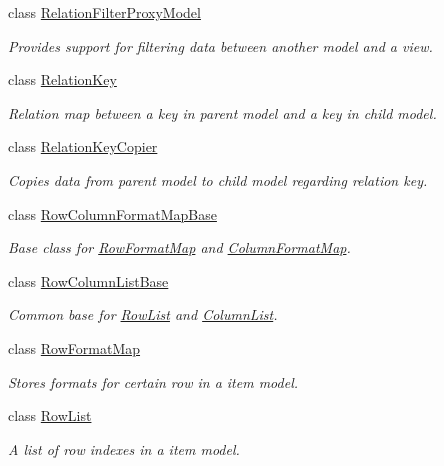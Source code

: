 \begin{DoxyCompactItemize}
class \hyperlink{class_mdt_1_1_item_model_1_1_relation_filter_proxy_model}{Relation\+Filter\+Proxy\+Model}
\begin{DoxyCompactList}\small\item\em Provides support for filtering data between another model and a view. \end{DoxyCompactList}\item 
class \hyperlink{class_mdt_1_1_item_model_1_1_relation_key}{Relation\+Key}
\begin{DoxyCompactList}\small\item\em Relation map between a key in parent model and a key in child model. \end{DoxyCompactList}\item 
class \hyperlink{class_mdt_1_1_item_model_1_1_relation_key_copier}{Relation\+Key\+Copier}
\begin{DoxyCompactList}\small\item\em Copies data from parent model to child model regarding relation key. \end{DoxyCompactList}\item 
class \hyperlink{class_mdt_1_1_item_model_1_1_row_column_format_map_base}{Row\+Column\+Format\+Map\+Base}
\begin{DoxyCompactList}\small\item\em Base class for \hyperlink{class_mdt_1_1_item_model_1_1_row_format_map}{Row\+Format\+Map} and \hyperlink{class_mdt_1_1_item_model_1_1_column_format_map}{Column\+Format\+Map}. \end{DoxyCompactList}\item 
class \hyperlink{class_mdt_1_1_item_model_1_1_row_column_list_base}{Row\+Column\+List\+Base}
\begin{DoxyCompactList}\small\item\em Common base for \hyperlink{class_mdt_1_1_item_model_1_1_row_list}{Row\+List} and \hyperlink{class_mdt_1_1_item_model_1_1_column_list}{Column\+List}. \end{DoxyCompactList}\item 
class \hyperlink{class_mdt_1_1_item_model_1_1_row_format_map}{Row\+Format\+Map}
\begin{DoxyCompactList}\small\item\em Stores formats for certain row in a item model. \end{DoxyCompactList}\item 
class \hyperlink{class_mdt_1_1_item_model_1_1_row_list}{Row\+List}
\begin{DoxyCompactList}\small\item\em A list of row indexes in a item model. \end{DoxyCompactList}\item 

\end{DoxyCompactItemize}
